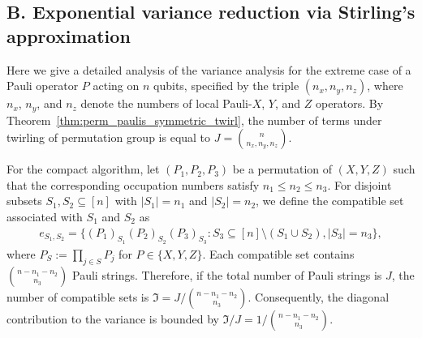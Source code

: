\documentclass[prl,aps,notitlepage,superscriptaddress,showpacs,nofootinbib]{revtex4-2}
\newcommand{\red}[1]{{\color{red} #1}}
\begin{document}
\red{
\subsection{B. Exponential variance reduction via Stirling's approximation}




Here we give a detailed analysis of the variance analysis for the extreme case of a Pauli operator $P$ acting on $n$ qubits, specified by the triple $(n_x, n_y, n_z)$, where $n_x$, $n_y$, and $n_z$ denote the numbers of local Pauli-$X$, $Y$, and $Z$ operators. 
By Theorem~\ref{thm:perm_paulis_symmetric_twirl}, the number of terms under twirling of permutation group is equal to $J={n \choose n_x,n_y,n_z}$.

For the compact algorithm, let $(P_1,P_2,P_3)$ be a permutation of $(X,Y,Z)$ such that the corresponding occupation numbers satisfy $n_1\le n_2\le n_3$. For disjoint subsets $S_1,S_2\subseteq [n]$ with $|S_1|=n_1$ and $|S_2|=n_2$, we define the compatible set associated with $S_1$ and $S_2$ as
\begin{align}
    e_{S_1,S_2}=\{(P_1)_{S_1}(P_2)_{S_2}(P_3)_{S_3}: S_3\subseteq [n]\setminus(S_1\cup S_2), |S_3|=n_3\},
\end{align}
where $P_S:=\prod_{j\in S}P_j$ for $P\in\{X,Y,Z\}$. Each compatible set contains $\binom{n-n_1-n_2}{n_3}$ Pauli strings. Therefore, if the total number of Pauli strings is $J$, the number of compatible sets is $\Im=J/\binom{n-n_1-n_2}{n_3}$. Consequently, the diagonal contribution to the variance is bounded by
$\Im/J=1/\binom{n-n_1-n_2}{n_3}$.

}
\end{document}
